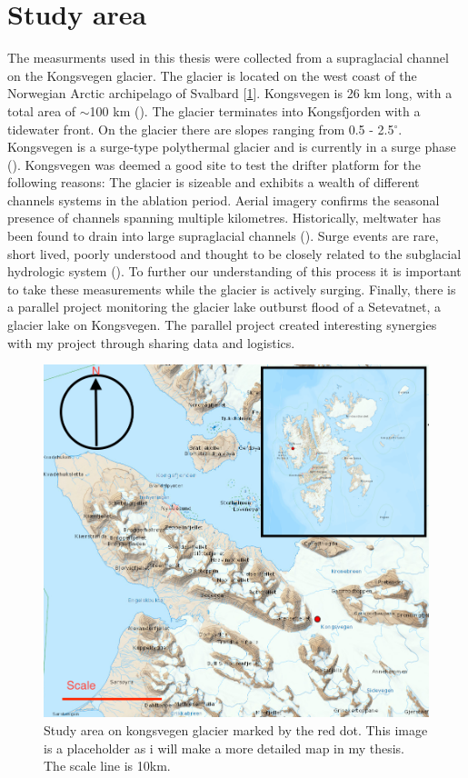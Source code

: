 \section{Study area}
The measurments used in this thesis were collected from a supraglacial channel on the Kongsvegen glacier. The glacier is located on the west coast of the Norwegian Arctic archipelago of Svalbard [\ref{fig:Study_area}]. Kongsvegen is 26 km long, with a total area of $\sim$100 km (\cite{kongsvegen_study_area}). The glacier terminates into Kongsfjorden with a tidewater front. On the glacier there are slopes ranging from 0.5 - 2.5$^\circ $. Kongsvegen is a surge-type polythermal glacier and is currently in a surge phase (\cite{verge_of_a_surge}). 
\newline
\newline
Kongsvegen was deemed a good site to test the drifter platform for the following reasons: The glacier is sizeable and exhibits a wealth of different channels systems in the ablation period. Aerial imagery confirms the seasonal presence of channels spanning multiple kilometres. Historically, meltwater has been found to drain into large supraglacial channels (\cite{Surge_type_glacier}). Surge events are rare, short lived, poorly understood and thought to be closely related to the subglacial hydrologic system (\cite{burgess_forster_larsen_braun_2012}). To further our understanding of this process it is important to take these measurements while the glacier is actively surging. Finally, there is a parallel project monitoring the glacier lake outburst flood of a Setevatnet, a glacier lake on Kongsvegen. The parallel project created interesting synergies with my project through sharing data and logistics. 
\begin{figure}[h]
    \centering
    \includegraphics[width = 12cm]{figures/Introduction/study_area.png}
    \caption{Study area on kongsvegen glacier marked by the red dot. This image is a placeholder as i will make a more detailed map in my thesis. The scale line is 10km.}
    \label{fig:Study_area}
\end{figure}

